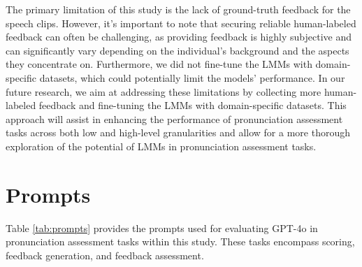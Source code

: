 \documentclass{Interspeech}
\begin{document}
The primary limitation of this study is the lack of ground-truth feedback for the speech clips. However, it's important to note that securing reliable human-labeled feedback can often be challenging, as providing feedback is highly subjective and can significantly vary depending on the individual's background and the aspects they concentrate on. Furthermore, we did not fine-tune the LMMs with domain-specific datasets, which could potentially limit the models' performance. In our future research, we aim at addressing these limitations by collecting more human-labeled feedback and fine-tuning the LMMs with domain-specific datasets. This approach will assist in enhancing the performance of pronunciation assessment tasks across both low and high-level granularities and allow for a more thorough exploration of the potential of LMMs in pronunciation assessment tasks.




\appendix
\onecolumn
\setcounter{table}{0}
\setcounter{figure}{0}
\setcounter{section}{0}
\setcounter{equation}{0}
\renewcommand{\thetable}{A\arabic{table}}
\renewcommand{\thefigure}{A\arabic{figure}}
\renewcommand{\theequation}{A\arabic{equation}}

\section{Prompts}
\label{app:prompts}

Table \ref{tab:prompts} provides the prompts used for evaluating GPT-4o in pronunciation assessment tasks within this study. These tasks encompass scoring, feedback generation, and feedback assessment.
\end{document}
